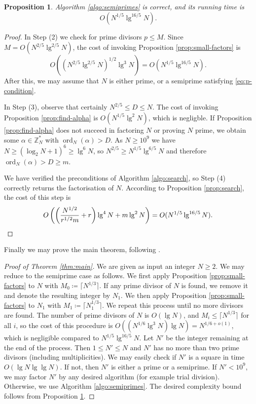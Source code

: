 \documentclass[reqno]{amsart}
\newtheorem{prop}[thm]{Proposition}
\theoremstyle{remark}
\numberwithin{equation}{section}
\numberwithin{thm}{section}
\newcommand{\ZZ}{\mathbb{Z}}
\renewcommand{\leq}{\leqslant}
\renewcommand{\geq}{\geqslant}
\newcommand{\defeq}{\coloneqq}
\DeclareMathOperator{\ord}{ord}
\begin{document}
\begin{prop}
\label{prop:semiprimes}
Algorithm \ref{algo:semiprimes} is correct, and its running time is
  \[ O(N^{1/5} \lg^{16/5} N). \]
\end{prop}
\begin{proof}
  In Step (2) we check for prime divisors $p \leq M$.
  Since $M = O(N^{2/5} \lg^{2/5} N)$,
  the cost of invoking Proposition \ref{prop:small-factors} is
    \[ O((N^{2/5} \lg^{2/5} N)^{1/2} \lg^3 N) = O(N^{1/5} \lg^{16/5} N). \]
  After this, we may assume that $N$ is either prime,
  or a semiprime satisfying \eqref{eq:p-condition}.
  
  In Step (3), observe that certainly $N^{2/5} \leq D \leq N$.
  The cost of invoking Proposition \ref{prop:find-alpha} is
  $O(N^{1/5} \lg^2 N)$, which is negligble.
  If Proposition \ref{prop:find-alpha} does not succeed in factoring $N$
  or proving $N$ prime,
  we obtain some $\alpha \in \ZZ_N^*$ with $\ord_N(\alpha) > D$.
  As $N \geq 10^9$ we have $N \geq (\log_2 N + 1)^6 \geq \lg^6 N$,
  so $N^{2/5} \geq N^{1/5} \lg^{6/5} N$ and therefore
  $\ord_N(\alpha) > D \geq m$.
  
  We have verified the preconditions of Algorithm \ref{algo:search},
  so Step (4) correctly returns the factorisation of $N$.
  According to Proposition \ref{prop:search},
  the cost of this step is
    \[ O\left(\left(\frac{N^{1/2}}{r^{1/2} m} + r\right) \lg^4 N + m \lg^2 N \right)
        = O(N^{1/5} \lg^{16/5} N). \qedhere \]
\end{proof}

Finally we may prove the main theorem, following \cite[\S6]{Hit-timespace}.
\begin{proof}[Proof of Theorem \ref{thm:main}]
  We are given as input an integer $N \geq 2$.
  We may reduce to the semiprime case as follows.
  We first apply Proposition \ref{prop:small-factors} to $N$ with
  $M_0 \defeq \lceil N^{1/3} \rceil$.
  If any prime divisor of $N$ is found, we remove it and denote the resulting
  integer by $N_1$.
  We then apply Proposition \ref{prop:small-factors} to $N_1$
  with $M_1 \defeq \lceil N_1^{1/3} \rceil$.
  We repeat this process until no more divisors are found.
  The number of prime divisors of $N$ is $O(\lg N)$,
  and $M_i \leq \lceil N^{1/3} \rceil$ for all $i$,
  so the cost of this procedure is
  $O((N^{1/6} \lg^3 N) \lg N) = N^{1/6+o(1)}$,
  which is negligible compared to $N^{1/5} \lg^{16/5} N$.
  Let $N'$ be the integer remaining at the end of the process.
  Then $1 \leq N' \leq N$ and $N'$ has no more than two prime divisors
  (including multiplicities).
  We may easily check if $N'$ is a square in time $O(\lg N \lg \lg N)$.
  If not, then $N'$ is either a prime or a semiprime.
  If $N' < 10^9$, we may factor $N'$ by any desired algorithm
  (for example trial division).
  Otherwise, we use Algorithm \ref{algo:semiprimes}.
  The desired complexity bound follows from Proposition \ref{prop:semiprimes}.
\end{proof}





\end{document}
